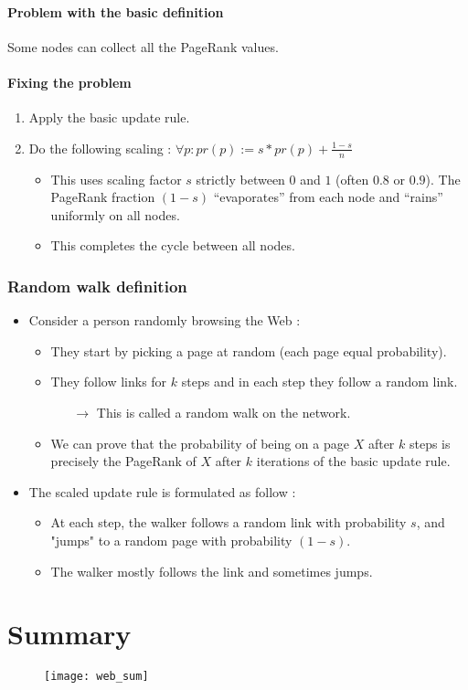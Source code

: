 \paragraph{Problem with the basic definition}

Some nodes can collect all the PageRank values.

\paragraph{Fixing the problem}

\begin{enumerate}
\item Apply the basic update rule.
\item Do the following scaling : $\forall p : pr(p) := s * pr(p) + \frac{1 - s}{n}$
	\begin{itemize}
	\item This uses scaling factor $s$ strictly between $0$ and $1$ (often $0.8$ or $0.9$). The PageRank fraction $(1-s)$ “evaporates” from each node and “rains” uniformly on all nodes.
	\item This completes the cycle between all nodes.
	\end{itemize}
\end{enumerate}

\subsubsection{Random walk definition}

\begin{itemize}
\item Consider a person randomly browsing the Web :
	\begin{itemize}
	\item They start by picking a page at random (each page equal probability).
	\item They follow links for $k$ steps and in each step they follow a random link.
		\begin{itemize}
		\item[$\rightarrow$] This is called a random walk on the network.
		\end{itemize}
	\item We can prove that the probability of being on a page $X$ after $k$ steps is precisely the PageRank of $X$ after $k$ iterations of the basic update rule.
	\end{itemize}
\item The scaled update rule is formulated as follow :
	\begin{itemize}
	\item At each step, the walker follows a random link with probability $s$, and "jumps" to a random page with probability $(1-s)$.
	\item The walker mostly follows the link and sometimes jumps.
	\end{itemize}
\end{itemize}

\section{Summary}

\begin{figure}[H]
    \centering
    \texttt{[image: web\_sum]}
\end{figure}

